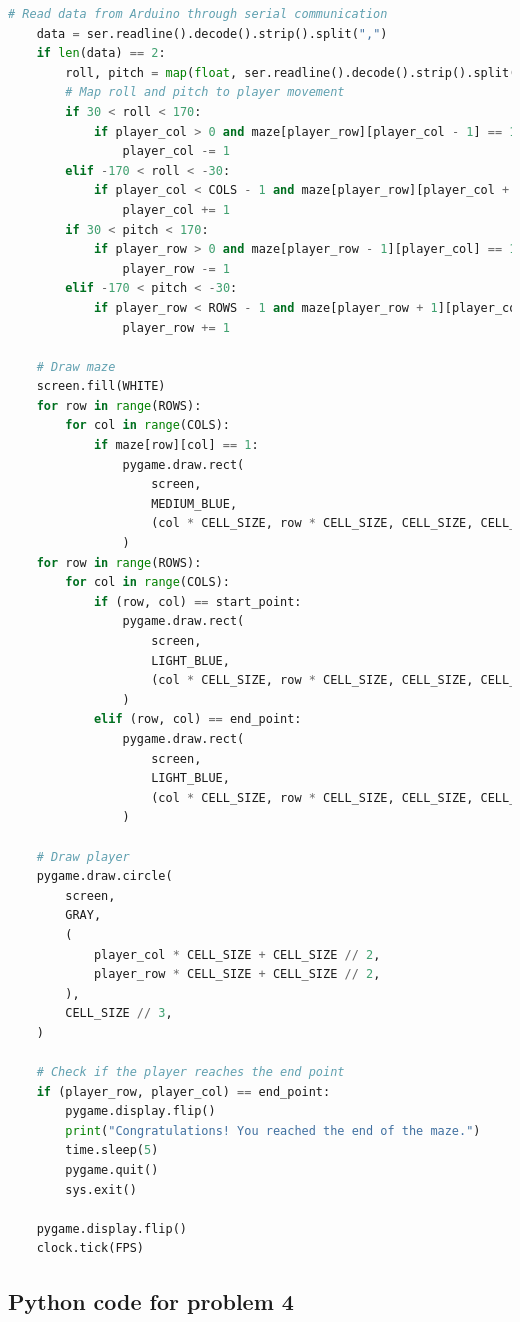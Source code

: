 \documentclass[conference]{IEEEtran}
\begin{document}
\begin{lstlisting}[language=Python]
    # Read data from Arduino through serial communication
    data = ser.readline().decode().strip().split(",")
    if len(data) == 2:
        roll, pitch = map(float, ser.readline().decode().strip().split(","))
        # Map roll and pitch to player movement
        if 30 < roll < 170:
            if player_col > 0 and maze[player_row][player_col - 1] == 1:
                player_col -= 1
        elif -170 < roll < -30:
            if player_col < COLS - 1 and maze[player_row][player_col + 1] == 1:
                player_col += 1
        if 30 < pitch < 170:
            if player_row > 0 and maze[player_row - 1][player_col] == 1:
                player_row -= 1
        elif -170 < pitch < -30:
            if player_row < ROWS - 1 and maze[player_row + 1][player_col] == 1:
                player_row += 1

    # Draw maze
    screen.fill(WHITE)
    for row in range(ROWS):
        for col in range(COLS):
            if maze[row][col] == 1:
                pygame.draw.rect(
                    screen,
                    MEDIUM_BLUE,
                    (col * CELL_SIZE, row * CELL_SIZE, CELL_SIZE, CELL_SIZE),
                )
    for row in range(ROWS):
        for col in range(COLS):
            if (row, col) == start_point:
                pygame.draw.rect(
                    screen,
                    LIGHT_BLUE,
                    (col * CELL_SIZE, row * CELL_SIZE, CELL_SIZE, CELL_SIZE),
                )
            elif (row, col) == end_point:
                pygame.draw.rect(
                    screen,
                    LIGHT_BLUE,
                    (col * CELL_SIZE, row * CELL_SIZE, CELL_SIZE, CELL_SIZE),
                )

    # Draw player
    pygame.draw.circle(
        screen,
        GRAY,
        (
            player_col * CELL_SIZE + CELL_SIZE // 2,
            player_row * CELL_SIZE + CELL_SIZE // 2,
        ),
        CELL_SIZE // 3,
    )

    # Check if the player reaches the end point
    if (player_row, player_col) == end_point:
        pygame.display.flip()
        print("Congratulations! You reached the end of the maze.")
        time.sleep(5)
        pygame.quit()
        sys.exit()

    pygame.display.flip()
    clock.tick(FPS)

\end{lstlisting}

\subsection{Python code for problem 4}
\end{document}
